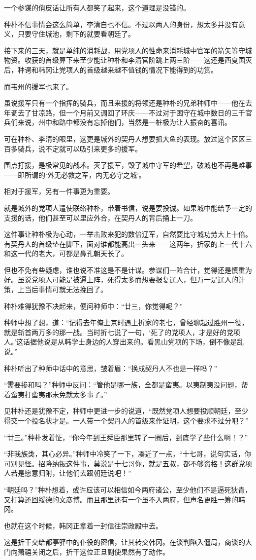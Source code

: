 一个参谋的俏皮话让所有人都笑了起来，这个道理是没错的。 

种朴不信事情会这么简单，李清自也不信。不过以两人的身份，想太多并没有意义，只要守住城池，剩下的就要看朝廷了。 

接下来的三天，就是单纯的消耗战，用党项人的性命来消耗城中官军的箭矢等守城物资。收获的首级算下来至少能让种朴和李清官阶跳上两三阶——这还是西夏国灭后，种谔和韩冈让党项人的首级越来越不值钱的情况下能得到的功赏。 

而韦州的援军也来了。 

虽说援军只有一个指挥的骑兵，而且来援的将领还是种朴的兄弟种师中——他在去年调去了甘凉路，但一个月前又调回了环庆——不过对于困守在城中数日的三千官兵们来说，州中和路中都没有忘掉他们，当然是一桩极为让人振奋的喜讯。 

可在种朴、李清的眼里，这更是城外的契丹人想要抓大鱼的表现。放过这个区区三百多骑兵，说不定就可以吸引来更多的援军。 

围点打援，是极常见的战术。灭了援军，毁了城中守军的希望，破城也不再是难事——即所谓的‘外无必救之军，内无必守之城’。 

相对于援军，另有一件事更为重要。 

就是城外的党项人遣使联络种朴，带着书信，说是要投诚。如果城中能给予一定的支援的话，他们甚至可以里应外合，在契丹人的背后捅上一刀。 

这件事让种朴极为心动，一举击败来犯的数倍辽军，自然要比守城功劳大上十倍。有契丹人的首级垫在脚下，面对谁都能高出一头来——这两年，折家的上一代十六和这一代的老大，可都是鼻孔朝天长了。 

但也不免有些疑虑，谁也说不准这是不是计谋。参谋们一阵合计，觉得还是慎重为好。虽说党项人可能是被逼上阵，死得太多而想要报复辽人，但万一是辽人的计策，上当后事情可就无法挽回了。 

种朴难得犹豫不决起来，便问种师中：“廿三，你觉得呢？” 

种师中想了想，道：“记得去年俺上京时遇上折家的老七，曾经聊起过胜州一役，就是斩首两万多的那一战。当时折七说了一句，‘死了的党项人，才是好的党项人。’这话据他说是从韩学士身边的人穿出来的。看黑山党项的下场，倒不像是乱说。” 

种朴听出了种师中话中的意思，皱着眉：“换成契丹人不也是一样吗？” 

“需要掺和吗？”种师中反问：“管他是哪一族，全都是蛮夷。以夷制夷没问题，帮着蛮夷打蛮夷那未免就太多事了。” 

见种朴还是犹豫不定，种师中更进一步的说道，“既然党项人想要投顺朝廷，至少得交一个投名状才是。一人带一个契丹人的首级来作证明，这个要求不过分吧？” 

“廿三。”种朴发着怔，“你今年到王舜臣那里转了一圈后，到底学了些什么啊！？” 

“非我族类，其心必异。”种师中冷笑了一下，凑近了一点，“十七哥，说句实话，你可别见怪。招降纳叛这件事，莫说是十七哥你，就是五叔，都不够资格！这群党项人若是愿意归附，让他们去跟朝廷说吧！” 

“朝廷吗？”种朴想着，或许应该可以相信如今两府诸公，至少他们不是逼死狄青，又打算还回绥德的文彦博。而且那里还有一个虽不入两府，但声名更胜一筹的韩冈。 

也就在这个时候，韩冈正拿着一封信往崇政殿中去。 

这是折干交给都亭驿中的仆役的密信，让其转交韩冈。在谈判陷入僵局，商谈的大门向萧禧关闭之后，折干这位正旦副使果然有了动作。 


